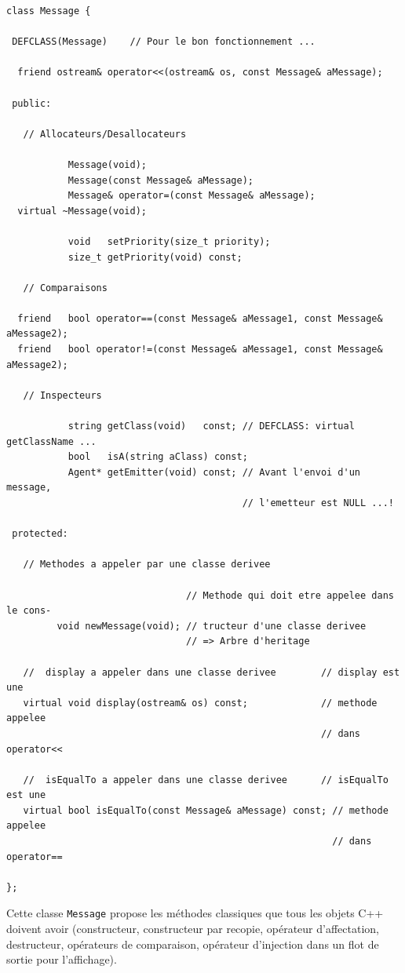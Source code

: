 \documentclass[12pt]{article}
\begin{document}
\begin{footnotesize}
\begin{verbatim}
class Message {

 DEFCLASS(Message)    // Pour le bon fonctionnement ...

  friend ostream& operator<<(ostream& os, const Message& aMessage);

 public:

   // Allocateurs/Desallocateurs

           Message(void);
           Message(const Message& aMessage);
           Message& operator=(const Message& aMessage);
  virtual ~Message(void);

           void   setPriority(size_t priority);
           size_t getPriority(void) const;

   // Comparaisons

  friend   bool operator==(const Message& aMessage1, const Message& aMessage2);
  friend   bool operator!=(const Message& aMessage1, const Message& aMessage2);

   // Inspecteurs

           string getClass(void)   const; // DEFCLASS: virtual getClassName ...
           bool   isA(string aClass) const;
           Agent* getEmitter(void) const; // Avant l'envoi d'un message,
                                          // l'emetteur est NULL ...!

 protected:

   // Methodes a appeler par une classe derivee

                                // Methode qui doit etre appelee dans le cons-
         void newMessage(void); // tructeur d'une classe derivee
                                // => Arbre d'heritage

   //  display a appeler dans une classe derivee        // display est une
   virtual void display(ostream& os) const;             // methode appelee
                                                        // dans operator<<

   //  isEqualTo a appeler dans une classe derivee      // isEqualTo est une
   virtual bool isEqualTo(const Message& aMessage) const; // methode appelee
                                                          // dans operator==

};
\end{verbatim}
\end{footnotesize}

Cette classe {\tt Message} propose les m\'ethodes classiques que
tous les objets C++ doivent avoir (constructeur, constructeur par recopie,
op\'erateur d'affectation, destructeur, op\'era\-teurs de comparaison,
op\'erateur d'injection dans un flot de sortie pour l'affichage).
\end{document}
